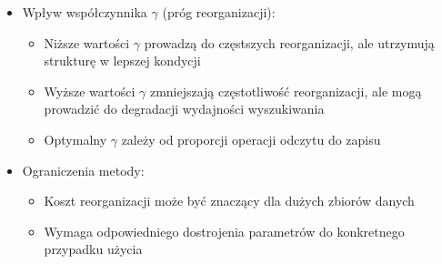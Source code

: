 \documentclass[12pt]{article}
\begin{document}
\begin{itemize}
    \item Wpływ współczynnika $\gamma$ (próg reorganizacji):
    \begin{itemize}
        \item Niższe wartości $\gamma$ prowadzą do częstszych reorganizacji, ale utrzymują strukturę w lepszej kondycji
        \item Wyższe wartości $\gamma$ zmniejszają częstotliwość reorganizacji, ale mogą prowadzić do degradacji wydajności wyszukiwania
        \item Optymalny $\gamma$ zależy od proporcji operacji odczytu do zapisu
    \end{itemize}

    \item Ograniczenia metody:
    \begin{itemize}
        \item Koszt reorganizacji może być znaczący dla dużych zbiorów danych
        \item Wymaga odpowiedniego dostrojenia parametrów do konkretnego przypadku użycia
    \end{itemize}
\end{itemize}
\end{document}
